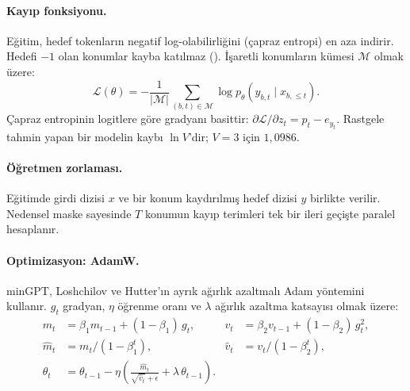 \paragraph{Kayıp fonksiyonu.} Eğitim, hedef tokenların negatif log-olabilirliğini (çapraz entropi) en aza indirir. Hedefi $-1$ olan konumlar kayba katılmaz (). İşaretli konumların kümesi $\mathcal{M}$ olmak üzere:
\begin{equation}
  \mathcal{L}(\theta) = -\frac{1}{|\mathcal{M}|} \sum_{(b,t) \in \mathcal{M}} \log p_\theta\left(y_{b,t} \mid x_{b,\le t}\right).
\end{equation}
Çapraz entropinin logitlere göre gradyanı basittir: $\partial\mathcal{L}/\partial z_t = p_t - e_{y_t}$. Rastgele tahmin yapan bir modelin kaybı $\ln V$'dir; $V=3$ için $1{,}0986$.

\paragraph{Öğretmen zorlaması.} Eğitimde girdi dizisi $x$ ve bir konum kaydırılmış hedef dizisi $y$ birlikte verilir. Nedensel maske sayesinde $T$ konumun kayıp terimleri tek bir ileri geçişte paralel hesaplanır.

\paragraph{Optimizasyon: AdamW.} minGPT, Loshchilov ve Hutter'ın \cite{adamw} ayrık ağırlık azaltmalı Adam yöntemini kullanır. $g_t$ gradyan, $\eta$ öğrenme oranı ve $\lambda$ ağırlık azaltma katsayısı olmak üzere:
\begin{equation}
\begin{aligned}
  m_t &= \beta_1 m_{t-1} + (1-\beta_1)\, g_t, & v_t &= \beta_2 v_{t-1} + (1-\beta_2)\, g_t^2, \\
  \hat m_t &= m_t/(1-\beta_1^t), & \hat v_t &= v_t/(1-\beta_2^t), \\
  \theta_t &= \theta_{t-1} - \eta \left( \frac{\hat m_t}{\sqrt{\hat v_t} + \epsilon} + \lambda\, \theta_{t-1} \right).
\end{aligned}
\end{equation}

